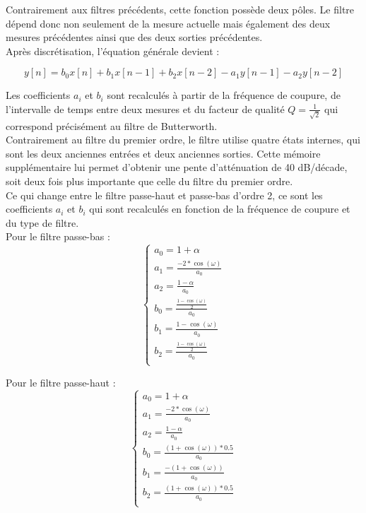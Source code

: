 Contrairement aux filtres précédents, cette fonction possède deux pôles. Le filtre dépend donc non seulement de la mesure actuelle mais également des deux mesures précédentes ainsi que des deux sorties précédentes. \\

Après discrétisation, l'équation générale devient :

\begin{equation}
    y[n] = b_{0}x[n] + b_{1}x[n-1] + b_{2}x[n-2] - a_{1}y[n-1] - a_{2}y[n-2]
\end{equation}

Les coefficients $a_{i}$ et $b_{i}$ sont recalculés à partir de la fréquence de coupure, de l'intervalle de temps entre deux mesures et du facteur de qualité $Q = \frac{1}{\sqrt{2}}$ qui correspond précisément au filtre de Butterworth. \\

Contrairement au filtre du premier ordre, le filtre utilise quatre états internes, qui sont les deux anciennes entrées et deux anciennes sorties. Cette mémoire supplémentaire lui permet d'obtenir une pente d'atténuation de 40 dB/décade, soit deux fois plus importante que celle du filtre du premier ordre. \\

Ce qui change entre le filtre passe-haut et passe-bas d'ordre 2, ce sont les coefficients $a_{i}$ et $b_{i}$ qui sont recalculés en fonction de la fréquence de coupure et du type de filtre. \\

Pour le filtre passe-bas :
\begin{equation}
    \begin{cases}
        a_{0} = 1 + \alpha \\
        a_{1} = \frac{-2 * \cos(\omega)}{a_{0}} \\
        a_{2} = \frac{1 - \alpha}{a_{0}} \\
        b_{0} = \frac{\frac{1 - \cos(\omega)}{2}}{a_{0}} \\
        b_{1} = \frac{1 - \cos(\omega)}{a_{0}} \\
        b_{2} = \frac{\frac{1 - \cos(\omega)}{2}}{a_{0}} \\
    \end{cases}
\end{equation}

Pour le filtre passe-haut :
\begin{equation}
    \begin{cases}
        a_{0} = 1 + \alpha \\
        a_{1} = \frac{-2 * \cos(\omega)}{a_{0}} \\
        a_{2} = \frac{1 - \alpha}{a_{0}} \\
        b_{0} = \frac{(1 + \cos(\omega)) * 0.5}{a_{0}} \\
        b_{1} = \frac{-(1 + \cos(\omega))}{a_{0}} \\
        b_{2} = \frac{(1 + \cos(\omega)) * 0.5}{a_{0}} \\
    \end{cases}
\end{equation}


